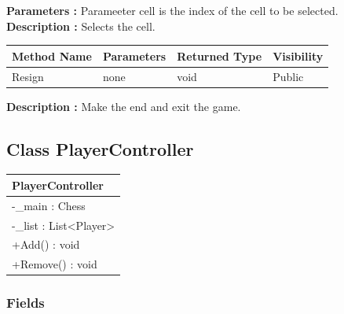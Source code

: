 \documentclass[12pt]{article}
\begin{document}
    \textbf{Parameters :} Parameeter cell is the index of the cell to be selected.
    \textbf{Description :} Selects the cell.

    \begin{table}[H]
        \begin{tabular}{|l|l|l|l|}
            \hline
            \rowcolor[HTML]{EFEFEF}
            \cellcolor[HTML]{EFEFEF}\textbf{Method Name} & \textbf{Parameters} & \textbf{Returned Type} & \textbf{Visibility} \\ \hline
            Resign                                       & none                & void                   & Public              \\ \hline
        \end{tabular}
    \end{table}

    \textbf{Description :} Make the end and exit the game.

    \newpage


    \subsection{Class PlayerController}

    \begin{table}[H]
        \begin{tabular}{|l|}
            \hline
            \rowcolor[HTML]{C0C0C0}
            \textbf{PlayerController}                         \\ \hline
            \rowcolor[HTML]{EFEFEF}
            -\_main : Chess                                   \\ \hline
            \rowcolor[HTML]{EFEFEF}
            -\_list : List\textless{}{}Player\textgreater{}{} \\ \hline
            \rowcolor[HTML]{FFFFFF}
            +Add() : void                                     \\ \hline
            \rowcolor[HTML]{FFFFFF}
            +Remove() : void                                  \\ \hline
        \end{tabular}
    \end{table}

    \subsubsection{Fields}
\end{document}
